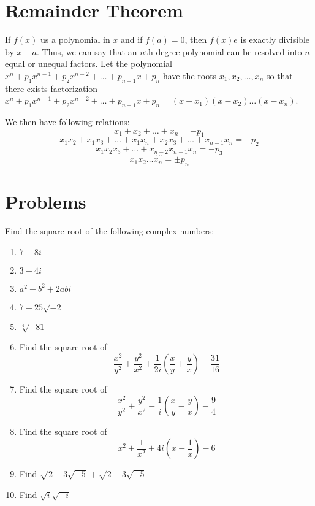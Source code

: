\begin{enumerate}
\begin{enumerate}
      \begin{figure}[H]
        \begin{center}
        \end{center}
      \end{figure}
    \end{enumerate}
\end{enumerate}

\section{Remainder Theorem}
If $f(x)$ us a polynomial in $x$ and if $f(a) = 0$, then $f(x)e$ is exactly divisible by $x - a$. Thus, we can say that an $n$th
degree polynomial can be resolved into $n$ equal or unequal factors. Let the polynomial $x^n + p_1x^{n - 1} + p_2x^{n - 2} + \ldots
+ p_{n - 1}x + p_n$ have the roots $x_1, x_2, \ldots, x_n$ so that there exists factorization $x^n + p_1x^{n - 1} + p_2x^{n - 2} + \ldots
+ p_{n - 1}x + p_n = (x - x_1)(x - x_2)\ldots(x - x_n)$.

We then have following relations:
$$x_1 + x_2 + \ldots + x_n = -p_1$$
$$x_1x_2 + x_1x_3 + \ldots + x_1x_n + x_2x_3 + \ldots + x_{n - 1}x_n = -p_2$$
$$x_1x_2x_3 + \ldots + x_{n -2}x_{n - 1}x_n = -p_3$$
$$\ldots$$
$$x_1x_2\ldots x_n = \pm p_n$$

\section{Problems}
Find the square root of the following complex numbers:

\begin{enumerate}
\item $7 + 8i$
\item $3 + 4i$
\item $a^2 - b^2 + 2abi$
\item $7 - 25\sqrt{-2}$
\item $\sqrt[4]{-81}$
\item Find the square root of $$\frac{x^2}{y^2} + \frac{y^2}{x^2} + \frac{1}{2i}\left(\frac{x}{y} + \frac{y}{x}\right) +
  \frac{31}{16}$$
\item Find the square root of $$\frac{x^2}{y^2} + \frac{y^2}{x^2} - \frac{1}{i}\left(\frac{x}{y} - \frac{y}{x}\right) -
  \frac{9}{4}$$
\item Find the square root of $$x^2 + \frac{1}{x^2} + 4i\left(x - \frac{1}{x}\right) - 6$$
\item Find $\sqrt{2 + 3\sqrt{-5}} + \sqrt{2 - 3\sqrt{-5}}$
\item Find $\sqrt{i}\sqrt{-i}$
\end{enumerate}

